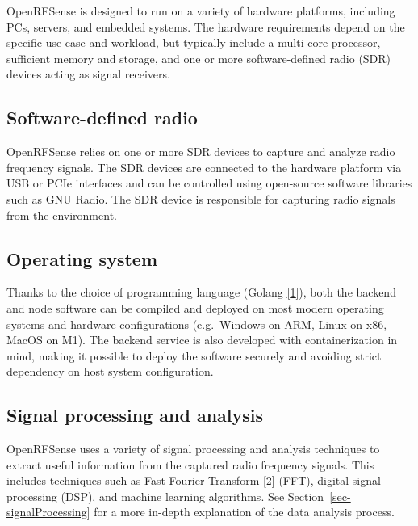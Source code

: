\documentclass[
  letterpaper,
  a4paper,
  12pt,
  titlepage,
  oneside,
  openany]{book}
\begin{document}
OpenRFSense is designed to run on a variety of hardware platforms,
including PCs, servers, and embedded systems. The hardware requirements
depend on the specific use case and workload, but typically include a
multi-core processor, sufficient memory and storage, and one or more
software-defined radio (SDR) devices acting as signal receivers.

\hypertarget{software-defined-radio}{%
\subsection{Software-defined radio}\label{software-defined-radio}}

OpenRFSense relies on one or more SDR devices to capture and analyze
radio frequency signals. The SDR devices are connected to the hardware
platform via USB or PCIe interfaces and can be controlled using
open-source software libraries such as GNU Radio. The SDR device is
responsible for capturing radio signals from the environment.

\hypertarget{operating-system}{%
\subsection{Operating system}\label{operating-system}}

Thanks to the choice of programming language (Golang
\protect\hyperlink{ref-GoProgrammingLanguage}{{[}1{]}}), both the
backend and node software can be compiled and deployed on most modern
operating systems and hardware configurations (e.g.~Windows on ARM,
Linux on x86, MacOS on M1). The backend service is also developed with
containerization in mind, making it possible to deploy the software
securely and avoiding strict dependency on host system configuration.

\hypertarget{signal-processing-and-analysis}{%
\subsection{Signal processing and
analysis}\label{signal-processing-and-analysis}}

OpenRFSense uses a variety of signal processing and analysis techniques
to extract useful information from the captured radio frequency signals.
This includes techniques such as Fast Fourier Transform
\protect\hyperlink{ref-heidemanGaussHistoryFast1984}{{[}2{]}} (FFT),
digital signal processing (DSP), and machine learning algorithms. See
Section~\ref{sec-signalProcessing} for a more in-depth explanation of
the data analysis process.
\end{document}
